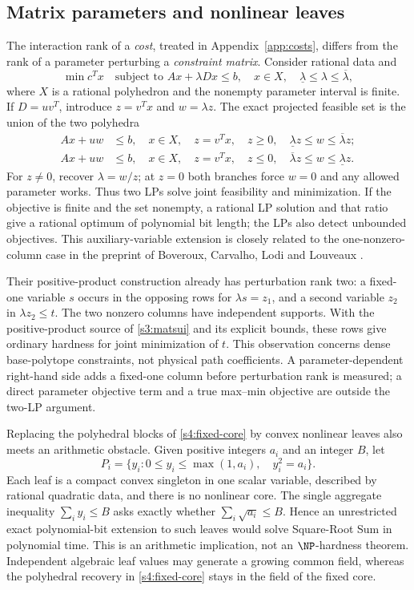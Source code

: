 \subsection{Matrix parameters and nonlinear leaves}\label{s6:parametric}
The interaction rank of a \emph{cost}, treated in Appendix~\ref{app:costs},
differs from the rank of a
parameter perturbing a \emph{constraint matrix}.
Consider rational data and
\[
 \min c^Tx\quad\text{subject to }Ax+\lambda Dx\le b,
 \quad x\in X,\quad\underline\lambda\le\lambda\le\overline\lambda,
\]
where $X$ is a rational polyhedron and the nonempty parameter interval
is finite. If $D=uv^T$, introduce $z=v^Tx$ and $w=\lambda z$.
The exact projected feasible set is the union of the two polyhedra
\begin{align*}
 Ax+uw&\le b,\quad x\in X,\quad z=v^Tx,\quad
 z\ge0,\quad\underline\lambda z\le w\le\overline\lambda z;\\
 Ax+uw&\le b,\quad x\in X,\quad z=v^Tx,\quad
 z\le0,\quad\overline\lambda z\le w\le\underline\lambda z.
\end{align*}
For $z\ne0$, recover $\lambda=w/z$; at $z=0$ both branches force
$w=0$ and any allowed parameter works. Thus two LPs solve joint
feasibility and minimization. If the objective is finite and the set
nonempty, a rational LP solution and that ratio give a rational optimum
of polynomial bit length; the LPs also detect unbounded objectives.
This auxiliary-variable extension is closely related to the
one-nonzero-column case in the preprint of Boveroux, Carvalho, Lodi and
Louveaux \cite[Section~3.3]{s6:boveroux2026}.

Their positive-product construction already has perturbation rank two:
a fixed-one variable $s$ occurs in the opposing rows for
$\lambda s=z_1$, and a second variable $z_2$ in
$\lambda z_2\le t$. The two nonzero columns have independent supports.
With the positive-product source of \cref{s3:matsui} and its explicit
bounds, these rows give ordinary hardness for joint minimization of $t$.
This observation concerns dense base-polytope constraints, not physical
path coefficients. A parameter-dependent right-hand side adds a fixed-one
column before perturbation rank is measured; a direct parameter objective
term and a true max--min objective are outside the two-LP argument.

Replacing the polyhedral blocks of \cref{s4:fixed-core} by convex
nonlinear leaves also meets an arithmetic obstacle. Given positive
integers $a_i$ and an integer $B$, let
\[
 P_i=\{y_i:0\le y_i\le\max(1,a_i),\quad y_i^2=a_i\}.
\]
Each leaf is a compact convex singleton in one scalar variable, described by
rational quadratic data, and there is no nonlinear core. The single
aggregate inequality $\sum_i y_i\le B$ asks exactly whether
$\sum_i\sqrt{a_i}\le B$. Hence an unrestricted exact polynomial-bit
extension to such leaves would solve Square-Root Sum in polynomial time.
This is an arithmetic implication, not an $\NP$-hardness theorem.
Independent algebraic leaf values may generate a growing common field,
whereas the polyhedral recovery in \cref{s4:fixed-core} stays in
the field of the fixed core.

